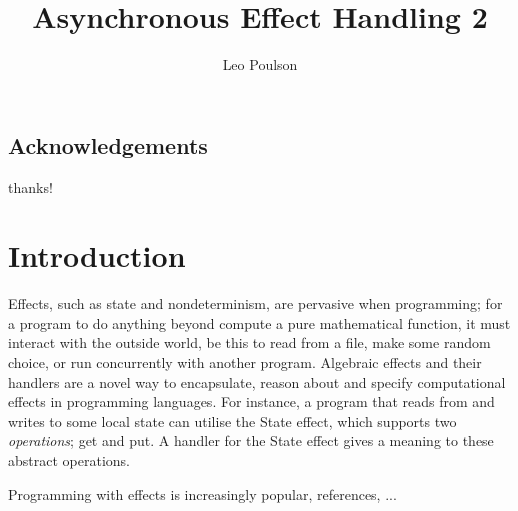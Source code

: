 \documentclass[msc,deptreport,cs]{infthesis} %
\begin{document}
\begin{preliminary}

\title{Asynchronous Effect Handling 2}

\author{Leo Poulson}


\maketitle

\section*{Acknowledgements}
thanks!

\tableofcontents

\end{preliminary}

\chapter{Introduction}

Effects, such as state and nondeterminism, are pervasive when programming; for a
program to do anything beyond compute a pure mathematical function, it must
interact with the outside world, be this to read from a file, make some random
choice, or run concurrently with another program. Algebraic effects and their
handlers are a novel way to encapsulate, reason about and specify computational
effects in programming languages. For instance, a program that reads from and
writes to some local state can utilise the \textsf{State} effect, which supports
two \emph{operations}; \textsf{get} and \textsf{put}. A handler for the
\textsf{State} effect gives a meaning to these abstract operations.

Programming with effects is increasingly popular, references, ...
\end{document}
